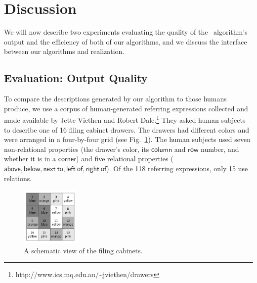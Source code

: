 \section{Discussion} \label{sec:discussion}

We will now describe two experiments evaluating the quality of the \el\
algorithm's output and the efficiency of both of our algorithms, and
we discuss the interface between our algorithms and realization.





\subsection{Evaluation: Output Quality}

To compare the descriptions generated by our algorithm to those humans
produce, we use a corpus of human-generated referring expressions
collected and made available by Jette Viethen and Robert
Dale.\footnote{http://www.ics.mq.edu.au/\~{}jviethen/drawers}  They
asked human subjects to describe one of 16 filing cabinet drawers. The
drawers had different colors and were arranged in a four-by-four grid
(see Fig.~\ref{fig:drawers}). The human subjects used seven
non-relational properties (the drawer's color, its $\mathsf{column}$
and $\mathsf{row}$ number, and whether it is in a $\mathsf{corner}$)
and five relational properties ($\mathsf{above, below, next\ to, left\
  of, right\ of}$). Of the 118 referring expressions, only 15 use
relations.

\begin{figure}
\begin{center}
\includegraphics[width=0.25\textwidth]{drawers.png}
\end{center}\vspace*{-3ex}
\caption{A schematic view of the filing cabinets.}\label{fig:drawers}\vspace*{-3ex}
\end{figure}


